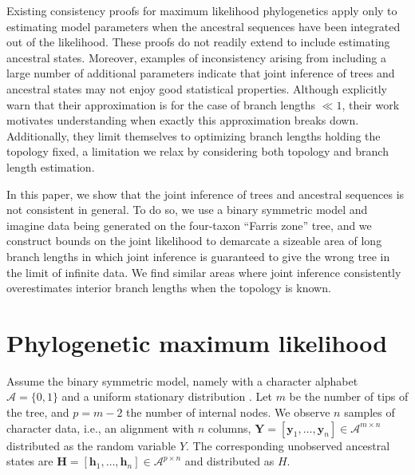 \documentclass{article}
\newcommand{\alphabet}{\mathcal{A}}
\newcommand{\fullAlignment}{\mathbf{Y}}
\newcommand{\alignmentColumn}{\mathbf{y}}
\newcommand{\alignmentColumnRV}{Y}
\newcommand{\fullAncestralStates}{\mathbf{H}}
\newcommand{\ancestralStateColumn}{\mathbf{h}}
\newcommand{\ancestralStateColumnRV}{H}
\newcommand{\nCols}{n}
\newcommand{\nSiteRows}{m}
\newcommand{\nAncestralStateRows}{p}
\begin{document}
Existing consistency proofs for maximum likelihood phylogenetics \cite{RoyChoudhury2015-ta} apply only to estimating model parameters when the ancestral sequences have been integrated out of the likelihood.
These proofs do not readily extend to include estimating ancestral states.
Moreover, examples of inconsistency arising from including a large number of additional parameters \cite{Neyman1948-tt} indicate that joint inference of trees and ancestral states may not enjoy good statistical properties.
Although \cite{Sagulenko2017-jo} explicitly warn that their approximation is for the case of branch lengths $\ll 1$, their work motivates understanding when exactly this approximation breaks down.
Additionally, they limit themselves to optimizing branch lengths holding the topology fixed, a limitation we relax by considering both topology and branch length estimation.

In this paper, we show that the joint inference of trees and ancestral sequences is not consistent in general.
To do so, we use a binary symmetric model and imagine data being generated on the four-taxon ``Farris zone'' \cite{Siddall1998-hq} tree, and we construct bounds on the joint likelihood to demarcate a sizeable area of long branch lengths in which joint inference is guaranteed to give the wrong tree in the limit of infinite data.
We find similar areas where joint inference consistently overestimates interior branch lengths when the topology is known.

\section*{Phylogenetic maximum likelihood}

Assume the binary symmetric model, namely with a character alphabet $\alphabet=\{0,1\}$ and a uniform stationary distribution \cite{Semple2003-em}.
Let $\nSiteRows$ be the number of tips of the tree, and $\nAncestralStateRows = \nSiteRows-2$ the number of internal nodes.
We observe $\nCols$ samples of character data, i.e., an alignment with $\nCols$ columns, $\fullAlignment=[\alignmentColumn_1,\ldots,\alignmentColumn_\nCols]\in\alphabet^{\nSiteRows\times\nCols}$ distributed as the random variable $\alignmentColumnRV$.
The corresponding unobserved ancestral states are $\fullAncestralStates=[\ancestralStateColumn_1,\ldots,\ancestralStateColumn_\nCols]\in\alphabet^{\nAncestralStateRows\times\nCols}$ and distributed as $\ancestralStateColumnRV$.
\end{document}
